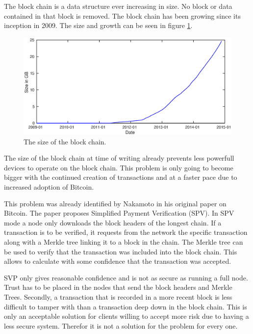 The block chain is a data structure ever increasing in size.
No block or data contained in that block is removed.
The block chain has been growing since its inception in 2009.
The size and growth can be seen in figure \ref{fig:bc-size}.

\begin{figure}
        \centerline{\includegraphics[scale=0.6]{relatedWork/figs/blockchainsize/blockchainsize.eps}}
        \caption{The size of the block chain.\cite{Blockchain.info-bcs}}
	\label{fig:bc-size}
\end{figure}

The size of the block chain at time of writing already prevents less powerfull devices
to operate on the block chain.
This problem is only going to become bigger with the continued creation of transactions
and at a faster pace due to increased adoption of Bitcoin.

This problem was already identified by Nakamoto in his original paper on Bitcoin.
The paper proposes Simplified Payment Verification (SPV).
In SPV mode a node only downloads the block headers of the longest chain.
If a transaction is to be verified, it requests from the network the specific transaction
along with a Merkle tree linking it to a block in the chain.
The Merkle tree can be used to verify that the transaction was included into the block chain.
This allows to calculate with some confidence that the transaction was accepted.

SVP only gives reasonable confidence and is not as secure as running a full node.
Trust has to be placed in the nodes that send the block headers and Merkle Trees.
Secondly, a transaction that is recorded in a more recent block is less difficult to tamper with
than a transaction deep down in the block chain.
This is only an acceptable solution for clients willing to accept more risk due to having a less secure system.
Therefor it is not a solution for the problem for every one.

